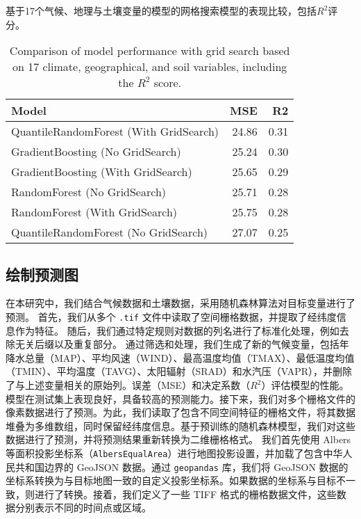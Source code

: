 \documentclass[AutoFakeBold]{LZUThesis-PgD&PhD}
\begin{document}
	
	

	
	\begin{table}[H]
		\centering
		\caption{基于17个气候、地理与土壤变量的模型的网格搜索模型的表现比较，包括$R^2$评分。}
		\caption*{Comparison of model performance with grid search based on 17 climate, geographical, and soil variables, including the $R^2$ score.}
		
		\begin{tabular}{lrr}
			\toprule
			Model & MSE & R2 \\
			\midrule
			QuantileRandomForest (With GridSearch) & 24.86 & 0.31 \\
			GradientBoosting (No GridSearch) & 25.24 & 0.30 \\
			GradientBoosting (With GridSearch) & 25.65 & 0.29 \\
			RandomForest (No GridSearch) & 25.71 & 0.28 \\
			RandomForest (With GridSearch) & 25.75 & 0.28 \\
			QuantileRandomForest (No GridSearch) & 27.07 & 0.25 \\
			\bottomrule
		\end{tabular}
	\end{table}
	
	\subsection{绘制预测图}
	\par
	在本研究中，我们结合气候数据和土壤数据，采用随机森林算法对目标变量进行了预测。
	首先，我们从多个 \texttt{.tif} 文件中读取了空间栅格数据，并提取了经纬度信息作为特征。
	随后，我们通过特定规则对数据的列名进行了标准化处理，例如去除无关后缀以及重复部分。
	通过筛选和处理，我们生成了新的气候变量，包括年降水总量（MAP）、平均风速（WIND）、最高温度均值（TMAX）、最低温度均值（TMIN）、平均温度（TAVG）、太阳辐射（SRAD）和水汽压（VAPR），并删除了与上述变量相关的原始列。误差（MSE）和决定系数（$R^2$）评估模型的性能。模型在测试集上表现良好，具备较高的预测能力。接下来，我们对多个栅格文件的像素数据进行了预测。为此，我们读取了包含不同空间特征的栅格文件，将其数据堆叠为多维数组，同时保留经纬度信息。基于预训练的随机森林模型，我们对这些数据进行了预测，并将预测结果重新转换为二维栅格格式。
	我们首先使用 Albers 等面积投影坐标系（\texttt{AlbersEqualArea}）进行地图投影设置，并加载了包含中华人民共和国边界的 GeoJSON 数据。通过 \texttt{geopandas} 库，我们将 GeoJSON 数据的坐标系转换为与目标地图一致的自定义投影坐标系。如果数据的坐标系与目标不一致，则进行了转换。接着，我们定义了一些 TIFF 格式的栅格数据文件，这些数据分别表示不同的时间点或区域。
	
\end{document}

